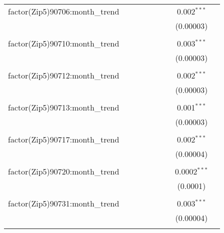 \begin{table}[H]
{\begin{tabular}{@{\extracolsep{5pt}}lcccccccc}
  factor(Zip5)90706:month\_trend &  &  &  &  &  &  & 0.002$^{***}$ &  \\  

   &  &  &  &  &  &  & (0.00003) &  \\  

   & & & & & & & & \\  

  factor(Zip5)90710:month\_trend &  &  &  &  &  &  & 0.003$^{***}$ &  \\  

   &  &  &  &  &  &  & (0.00003) &  \\  

   & & & & & & & & \\  

  factor(Zip5)90712:month\_trend &  &  &  &  &  &  & 0.002$^{***}$ &  \\  

   &  &  &  &  &  &  & (0.00003) &  \\  

   & & & & & & & & \\  

  factor(Zip5)90713:month\_trend &  &  &  &  &  &  & 0.001$^{***}$ &  \\  

   &  &  &  &  &  &  & (0.00003) &  \\  

   & & & & & & & & \\  

  factor(Zip5)90717:month\_trend &  &  &  &  &  &  & 0.002$^{***}$ &  \\  

   &  &  &  &  &  &  & (0.00004) &  \\  

   & & & & & & & & \\  

  factor(Zip5)90720:month\_trend &  &  &  &  &  &  & 0.0002$^{***}$ &  \\  

   &  &  &  &  &  &  & (0.0001) &  \\  

   & & & & & & & & \\  

  factor(Zip5)90731:month\_trend &  &  &  &  &  &  & 0.003$^{***}$ &  \\  

   &  &  &  &  &  &  & (0.00004) &  \\  

   & & & & & & & & \\  


\end{tabular}}
\end{table}
